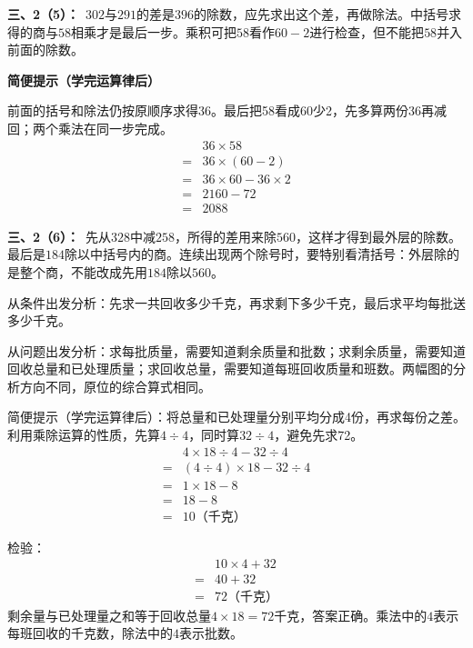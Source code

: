 \documentclass[multi=snippet,border=0pt]{standalone}
\newenvironment{snippet}[3]{\begin{minipage}{#1bp}\color{answerred}\fontsize{#2}{#3}\selectfont\raggedright}{\end{minipage}}
\begin{document}
\begin{snippet}{505}{11.5}{14}\textbf{三、2（5）：}\ \(302\)与\(291\)的差是\(396\)的除数，应先求出这个差，再做除法。中括号求得的商与\(58\)相乘才是最后一步。乘积可把\(58\)看作\(60-2\)进行检查，但不能把\(58\)并入前面的除数。\par\textbf{简便提示（学完运算律后）}\par 前面的括号和除法仍按原顺序求得36。最后把58看成60少2，先多算两份36再减回；两个乘法在同一步完成。\[\begin{aligned}&36\times58\\={}&36\times(60-2)\\={}&36\times60-36\times2\\={}&2160-72\\={}&2088\end{aligned}\]\end{snippet}
\begin{snippet}{505}{11.5}{14}\textbf{三、2（6）：}\ 先从\(328\)中减\(258\)，所得的差用来除\(560\)，这样才得到最外层的除数。最后是\(184\)除以中括号内的商。连续出现两个除号时，要特别看清括号：外层除的是整个商，不能改成先用\(184\)除以\(560\)。\end{snippet}
\begin{snippet}{505}{11.5}{14}从条件出发分析：先求一共回收多少千克，再求剩下多少千克，最后求平均每批送多少千克。\par 从问题出发分析：求每批质量，需要知道剩余质量和批数；求剩余质量，需要知道回收总量和已处理质量；求回收总量，需要知道每班回收质量和班数。两幅图的分析方向不同，原位的综合算式相同。\par 简便提示（学完运算律后）：将总量和已处理量分别平均分成4份，再求每份之差。利用乘除运算的性质，先算\(4\div4\)，同时算\(32\div4\)，避免先求72。\[\begin{aligned}&4\times18\div4-32\div4\\={}&(4\div4)\times18-32\div4\\={}&1\times18-8\\={}&18-8\\={}&10\text{（千克）}\end{aligned}\]\par 检验：\[\begin{aligned}&10\times4+32\\={}&40+32\\={}&72\text{（千克）}\end{aligned}\]剩余量与已处理量之和等于回收总量\(4\times18=72\)千克，答案正确。乘法中的\(4\)表示每班回收的千克数，除法中的\(4\)表示批数。\end{snippet}
\end{document}
